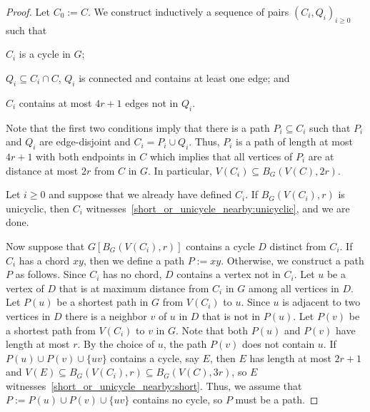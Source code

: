\documentclass{patmorin}
\begin{document}
\begin{proof}
  Let $C_0:=C$.
  We construct inductively a sequence of pairs $(C_i,Q_i)_{i\geq0}$ such that
  \begin{enumerate*}[label=\rm(\arabic*)]
    \item $C_i$ is a cycle in $G$;
    \item $Q_i\subseteq C_i\cap C$, $Q_i$ is connected and contains at least one edge; and
    \item $C_i$ contains at most $4r+1$ edges not in $Q_i$.
  \end{enumerate*}
  Note that the first two conditions imply that there is a path $P_i\subseteq C_i$  such that $P_i$ and $Q_i$ are edge-disjoint and $C_i=P_i\cup Q_i$. Thus, $P_i$ is a path of length at most $4r+1$ with both endpoints in $C$ which implies that all vertices of $P_i$ are at distance at most $2r$ from $C$ in $G$. In particular, $V(C_i)\subseteq B_G(V(C),2r)$.

  Let $i\geq0$ and suppose that we already have defined $C_i$. If $B_G(V(C_i),r)$ is unicyclic, then $C_i$ witnesses~\eqref{short_or_unicycle_nearby:unicyclic}, and we are done.

  Now suppose that $G[B_G(V(C_i),r)]$ contains a cycle $D$ distinct from $C_i$.  If $C_i$ has a chord $xy$, then we define a path $P:=xy$.  Otherwise, we construct a path $P$ as follows. Since $C_i$ has no chord, $D$ contains a vertex not in $C_i$.  Let $u$ be a vertex of $D$ that is at maximum distance from $C_i$ in $G$ among all vertices in $D$. Let $P(u)$ be a shortest path in $G$ from $V(C_i)$ to $u$. Since $u$ is adjacent to two vertices in $D$ there is a neighbor $v$ of $u$ in $D$ that is not in $P(u)$. Let $P(v)$ be a shortest path from $V(C_i)$ to $v$ in $G$. Note that both $P(u)$ and $P(v)$ have length at most $r$. By the choice of $u$, the path $P(v)$ does not contain $u$. If $P(u)\cup P(v)\cup\{uv\}$ contains a cycle, say $E$, then $E$ has length at most $2r+1$ and $V(E)\subseteq B_G(V(C_i),r)\subseteq B_G(V(C),3r)$, so $E$ witnesses~\eqref{short_or_unicycle_nearby:short}. Thus, we assume that $P:=P(u)\cup P(v)\cup\{uv\}$ contains no cycle, so $P$ must be a path.


\end{proof}
\end{document}
